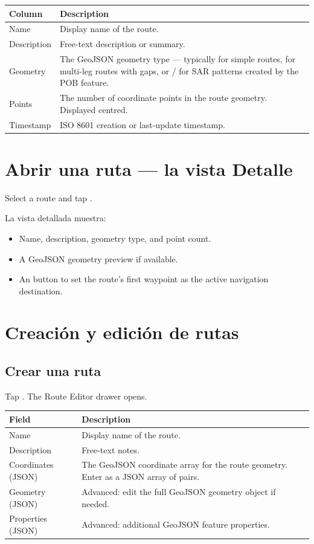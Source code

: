 \begin{longtable}{L{2.4cm} L{11.3cm}}
\toprule
{}
{\sffamily\bfseries\color{white} Column} &
{\sffamily\bfseries\color{white} Description} \\
\midrule
Name & Display name of the route. \\
Description & Free-text description or summary. \\
Geometry & The GeoJSON geometry type --- typically  for simple routes,  for multi-leg routes with gaps, or  /  for SAR patterns created by the POB feature. \\
Points & The number of coordinate points in the route geometry. Displayed centred. \\
Timestamp & ISO 8601 creation or last-update timestamp. \\
\bottomrule
\end{longtable}

\section{Abrir una ruta --- la vista Detalle}

Select a route and tap .


La vista detallada muestra:
\begin{itemize}
  \item Name, description, geometry type, and point count.
  \item A GeoJSON geometry preview if available.
  \item An  button to set the route's first waypoint as the active navigation destination.
\end{itemize}

\section{Creación y edición de rutas}

\subsection{Crear una ruta}

Tap . The Route Editor drawer opens.

\begin{longtable}{L{3cm} L{10.7cm}}
\toprule
{}
{\sffamily\bfseries\color{white} Field} &
{\sffamily\bfseries\color{white} Description} \\
\midrule
Name & Display name of the route. \\
Description & Free-text notes. \\
Coordinates (JSON) & The GeoJSON coordinate array for the route geometry. Enter as a JSON array of  pairs. \\
Geometry (JSON) & Advanced: edit the full GeoJSON geometry object if needed. \\
Properties (JSON) & Advanced: additional GeoJSON feature properties. \\
\bottomrule
\end{longtable}

